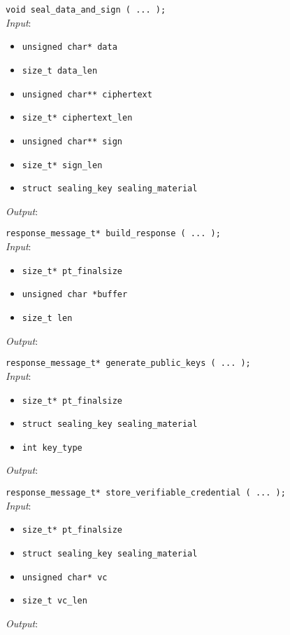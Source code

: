 \noindent
\texttt{void seal\_data\_and\_sign ( ... );}\\
\textit{Input}:
\begin{itemize}[noitemsep,nolistsep]
  \item \texttt{unsigned char* data}
  \item \texttt{size\_t data\_len}
  \item \texttt{unsigned char** ciphertext}
  \item \texttt{size\_t* ciphertext\_len}
  \item \texttt{unsigned char** sign}
  \item \texttt{size\_t* sign\_len}
  \item \texttt{struct sealing\_key sealing\_material}
\end{itemize}
\textit{Output}: 


\noindent
\texttt{response\_message\_t* build\_response ( ... );}\\
\textit{Input}:
\begin{itemize}[noitemsep,nolistsep]
\item \texttt{size\_t* pt\_finalsize}
\item \texttt{unsigned char *buffer}
\item \texttt{size\_t len}
\end{itemize}
\textit{Output}: 


\noindent
\texttt{response\_message\_t* generate\_public\_keys ( ... );}\\
\textit{Input}:
\begin{itemize}[noitemsep,nolistsep]
\item \texttt{size\_t* pt\_finalsize}
\item \texttt{struct sealing\_key sealing\_material}
\item \texttt{int key\_type}
\end{itemize}
\textit{Output}: 

\noindent
\texttt{response\_message\_t* store\_verifiable\_credential ( ... );
}\\
\textit{Input}:
\begin{itemize}[noitemsep,nolistsep]
  \item \texttt{size\_t* pt\_finalsize}
  \item \texttt{struct sealing\_key sealing\_material}
  \item \texttt{unsigned char* vc}
  \item \texttt{size\_t vc\_len}
\end{itemize}
\textit{Output}: 

